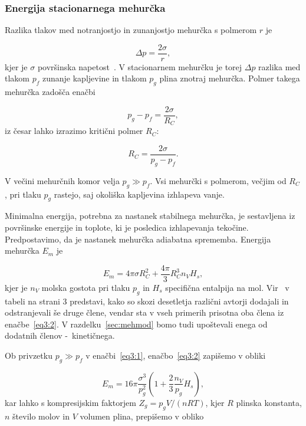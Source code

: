 \subsubsection*{Energija stacionarnega mehurčka}

Razlika tlakov med notranjostjo in zunanjostjo mehurčka s polmerom \( r \) je

\[  \Delta p = \frac{2 \sigma}{r},
\]
kjer je \( \sigma \) površinska napetost~\cite{kuscer_toplota_2017, seitz_theory_1958}. V stacionarnem mehurčku je torej \( \Delta p \) razlika med tlakom \( p_f \) zunanje kapljevine in tlakom \( p_g \) plina znotraj mehurčka. Polmer takega mehurčka zadošča enačbi

\[  p_g - p_f = \frac{2 \sigma}{R_C},
\]
iz česar lahko izrazimo kritični polmer \( R_C \):

\begin{equation}
\label{eq3:1}
 R_C = \frac{2 \sigma}{p_g - p_f}.
\end{equation}

V večini mehurčnih komor velja \( p_g \gg p_f \). Vsi mehurčki s polmerom, večjim od \( R_C \), pri tlaku \( p_g \) rastejo, saj okoliška kapljevina izhlapeva vanje.

Minimalna energija, potrebna za nastanek stabilnega mehurčka, je sestavljena iz površinske energije in toplote, ki je posledica izhlapevanja tekočine. Predpostavimo, da je nastanek mehurčka adiabatna sprememba. Energija mehurčka \( E_m \) je 

\begin{equation}
\label{eq3:2}
E_m = 4 \pi \sigma R_C ^2 + \frac{4 \pi}{3} R_C ^3 n_V H_s,
\end{equation}
kjer je \( n_V \) molska gostota pri tlaku \( p_g \) in \( H_s \) specifična entalpija na mol. Vir~\cite{bruno_critical_2019} v tabeli na strani 3 predstavi, kako so skozi desetletja različni avtorji dodajali in odstranjevali še druge člene, vendar sta v vseh primerih prisotna oba člena iz enačbe~\eqref{eq3:2}. V razdelku~\ref{sec:mehmod} bomo tudi upoštevali enega od dodatnih členov -\ kinetičnega. 

Ob privzetku \( p_g \gg p_f \) v enačbi~\eqref{eq3:1}, enačbo~\eqref{eq3:2} zapišemo v obliki

\[  E_m = 16 \pi\frac{\sigma ^3}{p_g ^2} \left( 1 + \frac{2}{3} \frac{n_V}{p_g} H_s \right),
\]
kar lahko s kompresijskim faktorjem \( Z_g = p_g V/ (nRT) \), kjer \( R \) plinska konstanta, \( n \) število molov in \( V \) volumen plina, prepišemo v obliko

